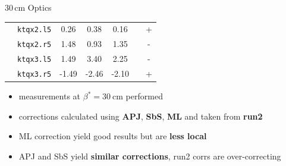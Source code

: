 \documentclass[4pt,usenames,dvipsnames,aspectratio=169,table]{beamer}
\newcommand{\highl}[1]{\textbf{#1}}
\begin{document}
\begin{frame}{30\,cm Optics }
\begin{center}
{{\begin{tabular}{l|lSSSS|c|}
         & \texttt{ktqx2.l5} & \color{RunTwored} 0.26 & \color{APJgreen} 0.38 & \color{SbSorange} 0.16 & \text{-} & + \\
         & \texttt{ktqx2.r5} & \color{RunTwored} 1.48 & \color{APJgreen} 0.93 & \color{SbSorange} 1.35 & \text{-} & - \\
         & \texttt{ktqx3.l5} & \color{RunTwored} 1.49 & \color{APJgreen} 3.40 & \color{SbSorange} 2.25 & \text{-} & - \\
         & \texttt{ktqx3.r5} & \color{RunTwored}-1.49 & \color{APJgreen}-2.46 & \color{SbSorange}-2.10 & \text{-} & + \\\hline \midrule
        \end{tabular} 
        }
        }
    \end{center}
    \begin{itemize}
        \item measurements at $\beta^*=\SI{30}{\centi\meter}$ performed
        \item corrections calculated using \highl{APJ}, \highl{SbS}, \highl{ML} and taken from \highl{run2}
        \item ML correction yield good results but are \highl{less local}
        \item APJ and SbS yield \highl{similar corrections},
            run2 corrs are over-correcting
    \end{itemize}
\end{frame}
\end{document}
